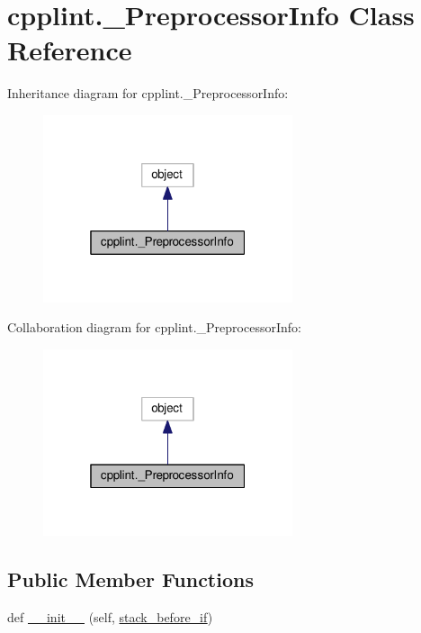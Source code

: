 \hypertarget{classcpplint_1_1__PreprocessorInfo}{}\section{cpplint.\+\_\+\+Preprocessor\+Info Class Reference}
\label{classcpplint_1_1__PreprocessorInfo}


Inheritance diagram for cpplint.\+\_\+\+Preprocessor\+Info\+:\nopagebreak
\begin{figure}[H]
\begin{center}
\leavevmode
\includegraphics[width=208pt]{classcpplint_1_1__PreprocessorInfo__inherit__graph}
\end{center}
\end{figure}


Collaboration diagram for cpplint.\+\_\+\+Preprocessor\+Info\+:\nopagebreak
\begin{figure}[H]
\begin{center}
\leavevmode
\includegraphics[width=208pt]{classcpplint_1_1__PreprocessorInfo__coll__graph}
\end{center}
\end{figure}
\subsection*{Public Member Functions}
\begin{DoxyCompactItemize}
\item 
def \hyperlink{classcpplint_1_1__PreprocessorInfo_a1394d17434a22d32b0ea9d6424e5c47b}{\+\_\+\+\_\+init\+\_\+\+\_\+} (self, \hyperlink{classcpplint_1_1__PreprocessorInfo_a0681b2adca3171a495fc1eca43d245c0}{stack\+\_\+before\+\_\+if})
\end{DoxyCompactItemize}
